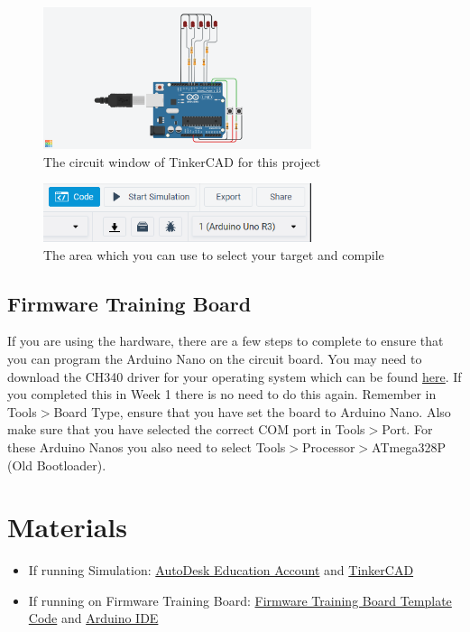 \documentclass{article}
\begin{document}
        \begin{figure}[ht]
            \centering
            \includegraphics[width = 0.7\textwidth]{images/TinkerCadWires.png}
            \caption{The circuit window of TinkerCAD for this project}
        \end{figure}
        
        \begin{figure}[ht]
            \centering
            \includegraphics[width = 0.7\textwidth]{images/TinkerCadCode.png}
            \caption{The area which you can use to select your target and compile}
        \end{figure}
    
    \subsection{Firmware Training Board}
    If you are using the hardware, there are a few steps to complete to ensure that you can program the Arduino Nano on the circuit board. You may need to download the CH340 driver for your operating system which can be found \href{https://learn.sparkfun.com/tutorials/how-to-install-ch340-drivers/all}{here}. If you completed this in Week 1 there is no need to do this again. Remember in Tools$>$Board Type, ensure that you have set the board to Arduino Nano. Also make sure that you have selected the correct COM port in Tools$>$Port. For these Arduino Nanos you also need to select Tools$>$Processor$>$ATmega328P (Old Bootloader). 
    
        
\section{Materials}
\begin{itemize}
	\item If running Simulation: \href{https://www.autodesk.com/education/edu-software/overview}{AutoDesk Education Account} and \href{https://www.tinkercad.com/things/8J1RA4SvqOM}{TinkerCAD}
	\item If running on Firmware Training Board: \href{https://github.com/RoboJackets/firmware-training/blob/master/code/Week2/Week_2_Template/Week_2_Template.ino}{Firmware Training Board Template Code} and \href{https://www.arduino.cc/en/software}{Arduino IDE}
\end{itemize}
\end{document}
